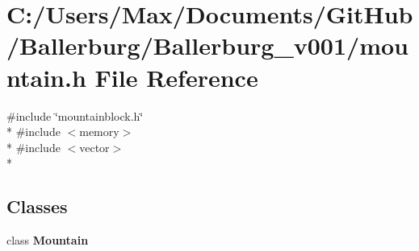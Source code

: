\section{C\+:/\+Users/\+Max/\+Documents/\+Git\+Hub/\+Ballerburg/\+Ballerburg\+\_\+v001/mountain.h File Reference}
\label{mountain_8h}
{\ttfamily \#include \char`\"{}mountainblock.\+h\char`\"{}}\\*
{\ttfamily \#include $<$memory$>$}\\*
{\ttfamily \#include $<$vector$>$}\\*
\subsection*{Classes}
\begin{DoxyCompactItemize}
\item 
class {\bf Mountain}
\end{DoxyCompactItemize}
